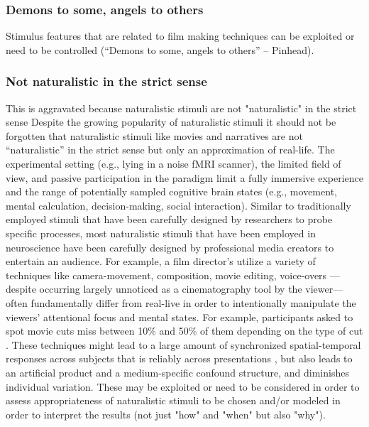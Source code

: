 \subsubsection{Demons to some, angels to others}


%
Stimulus features that are related to film making techniques can be exploited
\citep{haeusler2022processing, kauttonen2018brain} or need to be controlled
(``Demons to some, angels to others'' -- Pinhead).


\subsubsection{Not naturalistic in the strict sense}

%
This is aggravated because naturalistic stimuli are not "naturalistic" in the
strict sense
%
Despite the growing popularity of naturalistic stimuli it should not be
forgotten that naturalistic stimuli like movies and narratives are not
``naturalistic'' in the strict sense but only an approximation of real-life.
%
The experimental setting (e.g., lying in a noise fMRI scanner), the limited
field of view, and passive participation in the paradigm limit a fully immersive
experience and the range of potentially sampled cognitive brain states (e.g.,
movement, mental calculation, decision-making, social interaction).
%
Similar to traditionally employed stimuli that have been carefully designed by
researchers to probe specific processes, most naturalistic stimuli that have
been employed in neuroscience have been carefully designed by professional media
creators to entertain an audience.
%
For example, a film director's utilize a variety of techniques like
camera-movement, composition, movie editing, voice-overs
\citep{brown2012cinematography, dancyger2011film-technique, katz1991film,
mercado2011filmmakers}---despite occurring largely unnoticed as a cinematography
tool by the viewer---often fundamentally differ from real-live in order to
intentionally manipulate the viewers' attentional focus and mental states.
%
For example, participants asked to spot movie cuts miss between 10\% and 50\% of
them depending on the type of cut \citep{smith2008edit}.
%
These techniques might lead to a large amount of synchronized spatial-temporal
responses across subjects that is reliably across presentations
\citep{hasson2008neurocinematics}, but also leads to an artificial product and a
medium-specific confound structure, and diminishes individual variation.
%
These may be exploited or need to be considered in order to assess
appropriateness of naturalistic stimuli to be chosen and/or modeled in order to
interpret the results (not just "how" and "when" but also "why").


